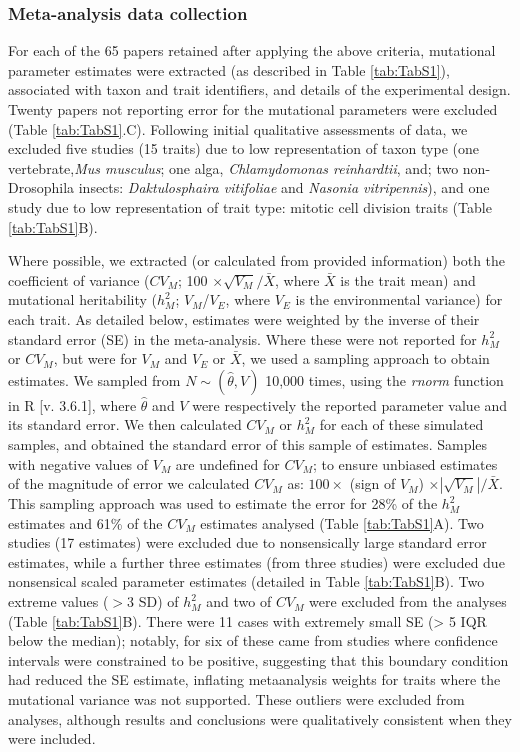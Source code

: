 \subsubsection{Meta-analysis data collection}
For each of the 65 papers retained after applying the above criteria, mutational parameter estimates were extracted (as described in Table \ref{tab:TabS1}), associated with taxon and trait identifiers, and details of the experimental design. Twenty papers not reporting error for the mutational parameters were excluded (Table \ref{tab:TabS1}.C). Following initial qualitative assessments of data, we excluded five studies (15 traits) due to low representation of taxon type (one vertebrate,\textit{Mus musculus}; one alga, \textit{Chlamydomonas reinhardtii}, and; two non-Drosophila insects: \textit{Daktulosphaira vitifoliae} and \textit{Nasonia vitripennis}), and one study due to low representation of trait type: mitotic cell division traits (Table \ref{tab:TabS1}B). \par

Where possible, we extracted (or calculated from provided information) both the coefficient of variance ($CV_M$; 100 $\times \sqrt{V_M}/ \bar{X}$, where $\bar{X}$ is the trait mean) and mutational heritability ($h_M^2$; $V_M$/$V_E$, where $V_E$ is the environmental variance) for each trait. As detailed below, estimates were weighted by the inverse of their standard error (SE) in the meta-analysis. Where these were not reported for $h_M^2$ or $CV_M$, but were for $V_M$ and $V_E$ or $\bar{X}$, we used a sampling approach to obtain estimates. We sampled from $N \sim (\hat\theta, V)$ 10,000 times, using the \textit{rnorm} function in R [v. 3.6.1], where	$\hat\theta$ and $V$ were respectively the reported parameter value and its standard error. We then calculated $CV_M$ or $h_M^2$ for each of these simulated samples, and obtained the standard error of this sample of estimates. Samples with negative values of $V_M$ are undefined for $CV_M$; to ensure unbiased estimates of the magnitude of error we calculated $CV_M$ as: $ 100 \times$ (sign of $V_M$) $\times \left|\sqrt{V_M}\right|/ \bar{X}$. This sampling approach was used to estimate the error for 28\% of the $h_M^2$ estimates and 61\% of the $CV_M$ estimates analysed (Table \ref{tab:TabS1}A). Two studies (17 estimates) were excluded due to nonsensically large standard error estimates, while a further three estimates (from three studies) were excluded due nonsensical scaled parameter estimates (detailed in Table \ref{tab:TabS1}B). Two extreme values ($> 3$ SD) of $h_M^2$ and two of $CV_M$ were excluded from the analyses (Table \ref{tab:TabS1}B). There were 11 cases with extremely small SE (> 5 IQR below the median); notably, for six of these came from studies where confidence intervals were constrained to be positive, suggesting that this boundary condition had reduced the SE estimate, inflating metaanalysis weights for traits where the mutational variance was not supported. These outliers were excluded from analyses, although results and conclusions were qualitatively consistent when they were included.\par

